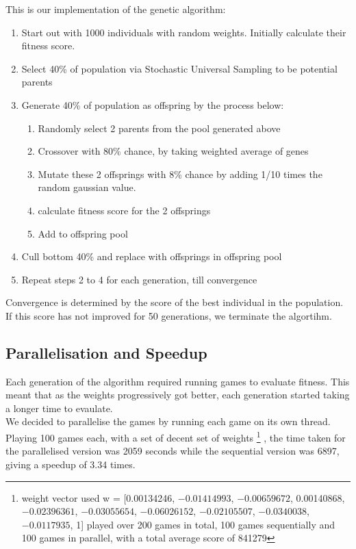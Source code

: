 \documentclass[a4paper,12pt,twocolumn]{article}
\begin{document}
This is our implementation of the genetic algorithm:
\begin{enumerate}
    \item Start out with 1000 individuals with random weights. Initially calculate
    their fitness score.
    \item Select 40\% of population via Stochastic Universal Sampling to be
            potential parents
    \item Generate 40\% of population as offspring by the process below:
        \begin{enumerate}
            \item Randomly select 2 parents from the pool generated above
            \item Crossover with 80\% chance, by taking weighted average of genes
            \item Mutate these 2 offsprings with 8\% chance by adding 1/10 times
                the random gaussian value.
            \item calculate fitness score for the 2 offsprings
            \item Add to offspring pool
        \end{enumerate}
    \item Cull bottom 40\% and replace with offsprings in offspring pool
    \item Repeat steps 2 to 4 for each generation, till convergence
\end{enumerate}

Convergence is determined by the score of the best individual in the population.
If this score has not improved for 50 generations, we terminate the algortihm.

\subsection{Parallelisation and Speedup}
\label{parallelisation_n_speedup}
Each generation of the algorithm required running games to evaluate fitness. This
meant that as the weights progressively got better, each generation started
taking a longer time to evaulate.\\

We decided to parallelise the games by running each game on its own thread. Playing
100 games each, with a set of decent set of weights
\footnote{
    weight vector used w = [0.00134246, $-0.01414993$, $-0.00659672$, 0.00140868, $-0.02396361$, $-0.03055654$, $-0.06026152$, $-0.02105507$, $-0.0340038$, $-0.0117935$, 1]
    played over 200 games in total, 100 games sequentially and 100 games in parallel, with a total average score of 841279
}
, the time taken for the parallelised version was 2059 seconds while the
sequential version was 6897, giving a speedup of 3.34 times.\\
\end{document}
